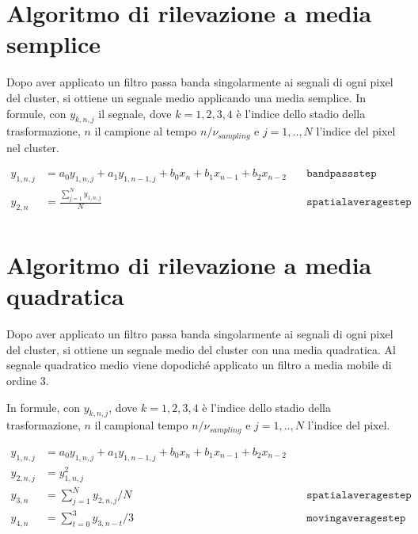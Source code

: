 \section{Algoritmo di rilevazione a media semplice}

Dopo aver applicato un filtro passa banda singolarmente ai segnali di ogni pixel del cluster, si ottiene un segnale medio applicando una media semplice.
In formule, con $y_{k, n, j}$ il segnale, dove $k=1, 2, 3, 4$ è l'indice dello stadio della trasformazione, $n$ il campione al tempo $n/\nu_{sampling}$ e $ j=1, .., N $ l'indice del pixel nel cluster.

\begin{align*}
y_{1, n, j } & = a_{0}y_{1, n, j } + a_{1}y_{1, n-1, j } + b_{0}x_{n} + b_{1}x_{n-1} + b_{2}x_{n-2}  &\quad\mathtt{band pass step}\\
y_{2, n    } & = \frac{\sum_{j=1}^{N} y_{1, n, j }}{N}  &\quad\mathtt{spatial average step}\\
\end{align*}



\section{Algoritmo di rilevazione a media quadratica}

Dopo aver applicato un filtro passa banda singolarmente ai segnali di ogni pixel del cluster, si ottiene un segnale medio del cluster con una media quadratica. Al segnale quadratico medio viene dopodiché applicato un filtro a media mobile di ordine 3.

In formule, con $y_{k, n, j}$, dove $k=1, 2, 3, 4$ è l'indice dello stadio della trasformazione, $n$ il campional tempo $n/\nu_{sampling}$ e $j=1, .., N$ l'indice del pixel.

\begin{align*}
y_{1, n, j } & = a_{0}y_{1, n, j } + a_{1}y_{1, n-1, j } + b_{0}x_{n} + b_{1}x_{n-1} + b_{2}x_{n-2}  \\
y_{2, n, j } & = y_{1, n,j}^{2}   \\
y_{3, n    } & = \sum_{j=1}^{N} y_{2, n, j } / N    &\quad\mathtt{spatial average step}\\
y_{4, n    } & = \sum_{t=0}^{3} y_{3, n-t } / 3 &\quad\mathtt{moving average step}
\end{align*}



